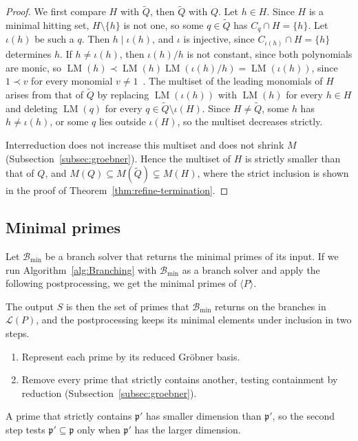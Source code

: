 \begin{proof}
  We first compare $H$ with $\widetilde Q$, then $\widetilde Q$ with $Q$.
  Let $h\in H$. Since $H$ is a minimal hitting set, $H\setminus\{h\}$ is not
  one, so some $q\in\widetilde Q$ has $C_q\cap H=\{h\}$. Let $\iota(h)$ be such
  a $q$. Then $h\mid\iota(h)$, and $\iota$ is injective, since
  $C_{\iota(h)}\cap H=\{h\}$ determines $h$. If $h\neq\iota(h)$, then
  $\iota(h)/h$ is not constant, since both polynomials are monic, so
  $\operatorname{LM}(h)\prec\operatorname{LM}(h)\operatorname{LM}(\iota(h)/h)
  =\operatorname{LM}(\iota(h))$, since $1\prec v$ for every monomial
  $v\neq1$~\cite[Ch.~2, \S4]{cox2015ideals}. The multiset of
  the leading monomials of $H$ arises from that of $\widetilde Q$ by replacing
  $\operatorname{LM}(\iota(h))$ with $\operatorname{LM}(h)$ for every $h\in H$
  and deleting $\operatorname{LM}(q)$ for every
  $q\in\widetilde Q\setminus\iota(H)$. Since $H\neq\widetilde Q$, some $h$ has
  $h\neq\iota(h)$, or some $q$ lies outside $\iota(H)$, so the multiset
  decreases strictly.

  Interreduction does not increase this multiset and does not shrink $M$
  (Subsection~\ref{subsec:groebner}). Hence the multiset of $H$ is strictly
  smaller than that of $Q$, and
  $M(Q)\subseteq M(\widetilde Q)\subsetneq M(H)$, where the strict inclusion is
  shown in the proof of Theorem~\ref{thm:refine-termination}.
\end{proof}

\subsection{Minimal primes}
\label{subsec:minimal-prime-decomposition}

Let $\mathcal B_{\min}$ be a branch solver that returns the minimal
primes of its input. If we run Algorithm~\ref{alg:Branching} with
$\mathcal B_{\min}$ as a branch solver and apply the following
postprocessing, we get the minimal primes of $\langle P\rangle$.

The output $S$ is then the set of primes that $\mathcal B_{\min}$ returns on
the branches in $\mathcal L(P)$, and the postprocessing keeps its minimal
elements under inclusion in two steps.
\begin{enumerate}
  \item Represent each prime by its reduced Gr\"obner basis.
  \item Remove every prime that strictly contains another, testing containment
    by reduction (Subsection~\ref{subsec:groebner}).
\end{enumerate}
A prime that strictly contains $\mathfrak p'$ has smaller dimension than
$\mathfrak p'$, so the second step tests $\mathfrak p'\subseteq\mathfrak p$
only when $\mathfrak p'$ has the larger dimension.

